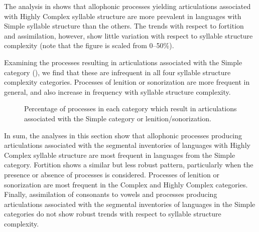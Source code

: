   The analysis in  shows that allophonic processes yielding articulations associated with Highly Complex syllable structure are more prevalent in languages with Simple syllable structure than the others. The trends with respect to fortition and assimilation, however, show little variation with respect to syllable structure complexity (note that the figure is scaled from 0--50\%).\largerpage

  Examining the processes resulting in articulations associated with the Simple category (), we find that these are infrequent in all four syllable structure complexity categories. Processes of lenition or sonorization are more frequent in general, and also increase in frequency with syllable structure complexity.

\begin{figure}[t]
\caption{\label{fig:7.5}Percentage of processes in each category which result in articulations associated with the Simple category or lenition/sonorization.}
\end{figure}

  In sum, the analyses in this section show that allophonic processes producing articulations associated with the segmental inventories of languages with Highly Complex syllable structure are most frequent in languages from the Simple category. Fortition shows a similar but less robust pattern, particularly when the presence or absence of processes is considered. Processes of lenition or sonorization are most frequent in the Complex and Highly Complex categories. Finally, assimilation of consonants to vowels and processes producing articulations associated with the segmental inventories of languages in the Simple categories do not show robust trends with respect to syllable structure complexity.

